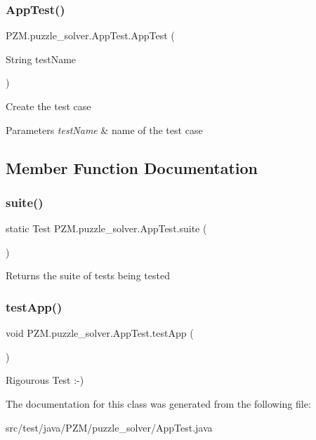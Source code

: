 \subsubsection{\texorpdfstring{App\+Test()}{AppTest()}}
{\footnotesize\ttfamily P\+Z\+M.\+puzzle\+\_\+solver.\+App\+Test.\+App\+Test (\begin{DoxyParamCaption}\item[{String}]{test\+Name }\end{DoxyParamCaption})}

Create the test case


\begin{DoxyParams}{Parameters}
{\em test\+Name} & name of the test case \\
\hline
\end{DoxyParams}


\subsection{Member Function Documentation}
\hypertarget{class_p_z_m_1_1puzzle__solver_1_1_app_test_afff2d4eeeefe140d3b87ef7bf9022cad}{}\label{class_p_z_m_1_1puzzle__solver_1_1_app_test_afff2d4eeeefe140d3b87ef7bf9022cad} 
\subsubsection{\texorpdfstring{suite()}{suite()}}
{\footnotesize\ttfamily static Test P\+Z\+M.\+puzzle\+\_\+solver.\+App\+Test.\+suite (\begin{DoxyParamCaption}{ }\end{DoxyParamCaption})\hspace{0.3cm}{\ttfamily [static]}}

\begin{DoxyReturn}{Returns}
the suite of tests being tested 
\end{DoxyReturn}
\hypertarget{class_p_z_m_1_1puzzle__solver_1_1_app_test_adbdc8d9da9022bad47e1a9fc26c61361}{}\label{class_p_z_m_1_1puzzle__solver_1_1_app_test_adbdc8d9da9022bad47e1a9fc26c61361} 
\subsubsection{\texorpdfstring{test\+App()}{testApp()}}
{\footnotesize\ttfamily void P\+Z\+M.\+puzzle\+\_\+solver.\+App\+Test.\+test\+App (\begin{DoxyParamCaption}{ }\end{DoxyParamCaption})}

Rigourous Test \+:-\/) 

The documentation for this class was generated from the following file\+:\begin{DoxyCompactItemize}
\item 
src/test/java/\+P\+Z\+M/puzzle\+\_\+solver/App\+Test.\+java\end{DoxyCompactItemize}
